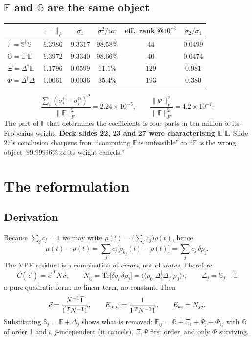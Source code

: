 \documentclass[11pt,a4paper]{article}
\newcommand{\FF}{\mathbb{F}}\newcommand{\GG}{\mathbb{G}}\newcommand{\EE}{\mathbb{E}}
\newcommand{\SS}{\mathbb{S}}\newcommand{\bad}{\textcolor{red!70!black}}
\begin{document}
\subsection{$\FF$ and $\GG$ are the same object}
\begin{center}\small
\begin{tabular}{@{}lccccc@{}}
\toprule
 & $\|\cdot\|_F$ & $\sigma_1$ & $\sigma_1^2/\mathrm{tot}$ & eff.\ rank @$10^{-3}$ & $\sigma_2/\sigma_1$\\
\midrule
$\FF=\SS^\dagger\SS$ & $9.3986$ & $9.3317$ & $98.58\%$ & $44$ & $0.0499$\\
$\GG=\EE^\dagger\EE$ & $9.3972$ & $9.3340$ & $98.66\%$ & $40$ & $0.0474$\\
$\Xi=\Delta^\dagger\EE$ & $0.1796$ & $0.0599$ & $11.1\%$ & $129$ & $0.981$\\
$\Phi=\Delta^\dagger\Delta$ & $\mathbf{0.0061}$ & $0.0036$ & $35.4\%$ & $193$ & $0.380$\\
\bottomrule
\end{tabular}
\end{center}
\[
\frac{\sum_i(\sigma_i^\FF-\sigma_i^\GG)^2}{\|\FF\|_F^2}=2.24\times10^{-5},
\qquad \frac{\|\Phi\|_F^2}{\|\FF\|_F^2}=4.2\times10^{-7}.
\]
The part of $\FF$ that determines the coefficients is four parts in ten million of its
Frobenius weight. \textbf{Deck slides 22, 23 and 27 were characterising $\EE^\dagger\EE$.}
Slide 27's conclusion sharpens from ``computing $\FF$ is unfeasible'' to ``$\FF$ is the wrong
object: $99.99996\%$ of its weight cancels.''

\section{The reformulation}

\subsection{Derivation}
Because $\sum_jc_j=1$ we may write $\rho(t)=\big(\sum_jc_j\big)\rho(t)$, hence
\[
\mu(t)-\rho(t)=\sum_jc_j\big[\rho_{k_j}(t)-\rho(t)\big]=\sum_jc_j\,\delta\rho_j .
\]
The MPF residual is a combination of \emph{errors}, not of \emph{states}. Therefore
\[
\boxed{\;C(\vec c)=\vec c^{\,T}N\vec c,\qquad N_{ij}=\mathrm{Tr}\big[\delta\rho_i\,\delta\rho_j\big]
=\langle\langle\rho_0|\Delta_i^\dagger\Delta_j|\rho_0\rangle\rangle,\qquad \Delta_j=\SS_j-\EE\;}
\]
a pure quadratic form: no linear term, no constant. Then
\[
\vec c=\frac{N^{-1}\vec1}{\vec1^{\,T}N^{-1}\vec1},\qquad
E_{\rm mpf}=\frac{1}{\vec1^{\,T}N^{-1}\vec1},\qquad E_{k_j}=N_{jj}.
\]
Substituting $\SS_j=\EE+\Delta_j$ shows what is removed:
$\FF_{ij}=\GG+\Xi_i+\Psi_j+\Phi_{ij}$ with $\GG$ of order 1 and $i,j$-independent (it cancels),
$\Xi,\Psi$ first order, and only $\Phi$ surviving.
\end{document}

